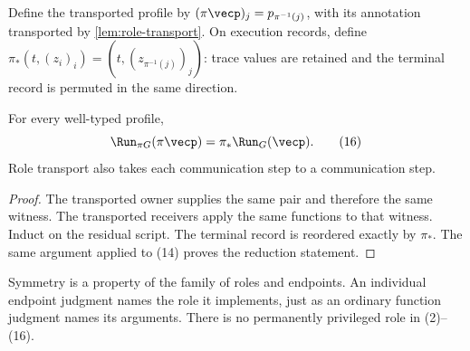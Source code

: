 Define the transported profile by $(\pi\vecp)_j=p_{\pi^{-1}(j)}$, with its
annotation transported by \cref{lem:role-transport}. On execution records,
define $\pi_*(t,(z_i)_i)=(t,(z_{\pi^{-1}(j)})_j)$: trace values are retained
and the terminal record is permuted in the same direction.

\begin{lemma}[Equivariance]
\label{thm:equivariance}
For every well-typed profile,
\[
 \Run_{\pi G}(\pi\vecp)=\pi_*\Run_G(\vecp).
 \tag{16}
\]
Role transport also takes each communication step to a communication step.
\end{lemma}
\begin{proof}
The transported owner supplies the same pair and therefore the same witness.
The transported receivers apply the same functions to that witness. Induct on
the residual script. The terminal record is reordered exactly by $\pi_*$.
The same argument applied to (14) proves the reduction statement.
\end{proof}

Symmetry is a property of the family of roles and endpoints. An individual
endpoint judgment names the role it implements, just as an ordinary function
judgment names its arguments. There is no permanently privileged role in
(2)--(16).
